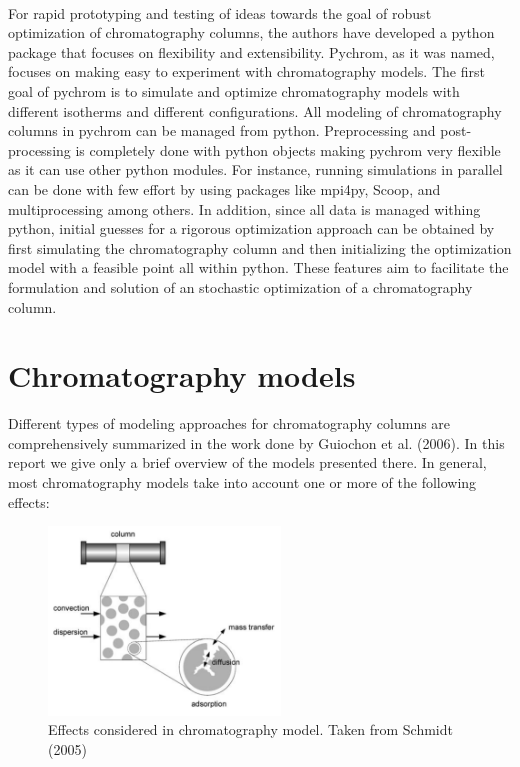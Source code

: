 \documentclass[paper=a4, fontsize=11pt]{scrartcl}
\begin{document}
\\
For rapid prototyping and testing of ideas towards the goal of robust optimization of chromatography columns, the authors have developed a python package that focuses on flexibility and extensibility. Pychrom, as it was named, focuses on making easy to experiment with chromatography models. The first goal of pychrom is to simulate and optimize chromatography models with different isotherms and different configurations. All modeling of chromatography columns in pychrom can be managed from python. Preprocessing and post-processing is completely done with python objects making pychrom very flexible as it can use other python modules. For instance, running simulations in parallel can be done with few effort by using packages like mpi4py, Scoop, and multiprocessing among others. In addition, since all data is managed withing python, initial guesses for a rigorous optimization approach can be obtained by first simulating the chromatography column and then initializing the optimization model with a feasible point all within python. These features aim to facilitate the formulation and solution of an stochastic optimization of a chromatography column. 
 

\section{Chromatography models}

Different types of modeling approaches for chromatography columns are comprehensively summarized in the work done by Guiochon et al. (2006). In this report we give only a brief overview of the models presented there. In general, most chromatography models take into account one or more of the following effects:

\begin{figure}[h]
\centering
\includegraphics[width=0.55\textwidth]{diagramtransport.png}
\caption{Effects considered in chromatography model. Taken from Schmidt (2005)}
\end{figure}
\end{document}
